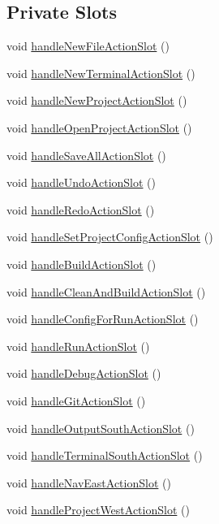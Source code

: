 \subsection*{Private Slots}
\begin{DoxyCompactItemize}
\item 
void \hyperlink{class_master_actions_a75943822eee1dbbc3e7c6c1dda4780a0}{handle\-New\-File\-Action\-Slot} ()
\item 
void \hyperlink{class_master_actions_af1fa0d0d7b074abb49ae5dd6bccffbe9}{handle\-New\-Terminal\-Action\-Slot} ()
\item 
void \hyperlink{class_master_actions_a81d07306e15f16a66e992138faccfab5}{handle\-New\-Project\-Action\-Slot} ()
\item 
void \hyperlink{class_master_actions_abefe5adf2e269a408626ea1caee182ca}{handle\-Open\-Project\-Action\-Slot} ()
\item 
void \hyperlink{class_master_actions_a92d9fcaac21c09534c568b3aca195a87}{handle\-Save\-All\-Action\-Slot} ()
\item 
void \hyperlink{class_master_actions_a87a24d9944e6140a6ae0de92dc8e5647}{handle\-Undo\-Action\-Slot} ()
\item 
void \hyperlink{class_master_actions_a7aa83031542aeafb3f3afe244ce2cd67}{handle\-Redo\-Action\-Slot} ()
\item 
void \hyperlink{class_master_actions_a8b46b8a5873dfff5a85e21a7e636b4bf}{handle\-Set\-Project\-Config\-Action\-Slot} ()
\item 
void \hyperlink{class_master_actions_aa9af30e92d9f9e4ffb8044f092b06d07}{handle\-Build\-Action\-Slot} ()
\item 
void \hyperlink{class_master_actions_ac3621bfbde9a2b681d4d35ae72bd6f14}{handle\-Clean\-And\-Build\-Action\-Slot} ()
\item 
void \hyperlink{class_master_actions_a294fc01ac639ffcdf9b76378f0d21306}{handle\-Config\-For\-Run\-Action\-Slot} ()
\item 
void \hyperlink{class_master_actions_a8504741522d18cb1a5fb21b6ad6de14b}{handle\-Run\-Action\-Slot} ()
\item 
void \hyperlink{class_master_actions_acc96d5f9401e97aa2a4700a47cfa71bd}{handle\-Debug\-Action\-Slot} ()
\item 
void \hyperlink{class_master_actions_ac8b0e41e5f68cdc5c845ec9184b2cd6d}{handle\-Git\-Action\-Slot} ()
\item 
void \hyperlink{class_master_actions_afb11d896980c526784b05a440e6f21ac}{handle\-Output\-South\-Action\-Slot} ()
\item 
void \hyperlink{class_master_actions_a3f3ec7277966d98a9fc5df5ceca1fa97}{handle\-Terminal\-South\-Action\-Slot} ()
\item 
void \hyperlink{class_master_actions_a86d0a64d13866d196c05906dfae37b73}{handle\-Nav\-East\-Action\-Slot} ()
\item 
void \hyperlink{class_master_actions_a64bf020d68866c8941c01929879eb839}{handle\-Project\-West\-Action\-Slot} ()
\end{DoxyCompactItemize}
